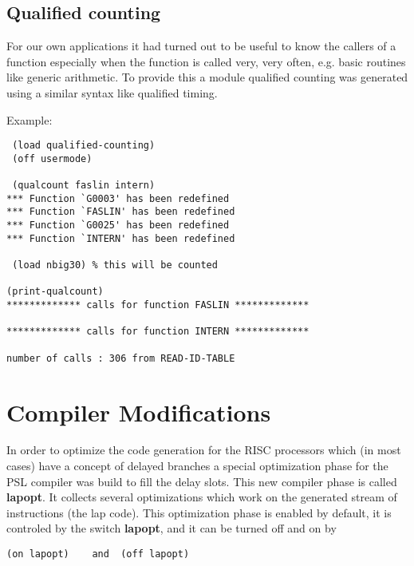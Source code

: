 \subsection{Qualified counting}

For our own applications it had turned out to be useful to know the
callers of a function especially when the function is called very,
very often, e.g. basic routines like generic arithmetic. To 
provide this a module qualified counting was generated using a similar
syntax like qualified timing.
\\




Example:

\begin{verbatim}
 (load qualified-counting)
 (off usermode)

 (qualcount faslin intern)
*** Function `G0003' has been redefined
*** Function `FASLIN' has been redefined
*** Function `G0025' has been redefined
*** Function `INTERN' has been redefined

 (load nbig30) % this will be counted

(print-qualcount)
************* calls for function FASLIN *************

************* calls for function INTERN *************

number of calls : 306 from READ-ID-TABLE
\end{verbatim}


\section{Compiler Modifications}

In order to optimize the code generation for the RISC processors which
(in most cases) have a concept of delayed branches a special optimization
phase for the PSL compiler was build to fill the delay slots. This 
new compiler phase is called {\bf lapopt}. It collects several optimizations
which work on the generated stream of instructions 
(the lap code). This  optimization phase is enabled by default,
it is controled by the switch {\bf lapopt}, and it can be turned off and on by
\begin{verbatim}
(on lapopt)    and  (off lapopt)
\end{verbatim}

